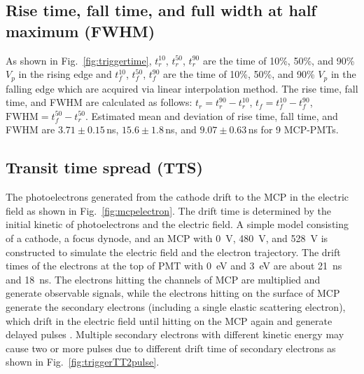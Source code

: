 \subsection{Rise time, fall time, and full width at half maximum (FWHM)}
As shown in Fig.~\ref{fig:triggertime}, $t^{10}_r$, $t^{50}_r$, $t^{90}_r$ are the time of 10\%, 50\%, and 90\% $V_p$ in the rising edge and $t^{10}_f$, $t^{50}_f$, $t^{90}_f$ are the time of 10\%, 50\%, and 90\% $V_p$ in the falling edge which are acquired via linear interpolation method. The rise time, fall time, and FWHM are calculated as follows: $t_r = t^{90}_r - t^{10}_r$, $t_f = t^{10}_f - t^{90}_f$, $\mathrm{FWHM} = t^{50}_f - t^{50}_r$. Estimated mean and deviation of rise time, fall time, and FWHM are $3.71\pm0.15$\,ns, $15.6\pm1.8$\,ns, and $9.07\pm0.63$\,ns for 9 MCP-PMTs.

\subsection{Transit time spread (TTS)}
The photoelectrons generated from the cathode drift to the MCP in the electric field as shown in Fig.~\ref{fig:mcpelectron}. The drift time is determined by the initial kinetic of photoelectrons and the electric field. A simple model consisting of a cathode, a focus dynode, and an MCP with \SI{0}{V}, \SI{480}{V}, and \SI{528}{V} is constructed to simulate the electric field and the electron trajectory. The drift times of the electrons at the top of PMT with \SI{0}{eV} and \SI{3}{eV} are about \SI{21}{ns} and \SI{18}{ns}. The electrons hitting the channels of MCP are multiplied and generate observable signals, while the electrons hitting on the surface of MCP generate the secondary electrons (including a single elastic scattering electron), which drift in the electric field until hitting on the MCP again and generate delayed pulses \cite{KM3NetTesting}. Multiple secondary electrons with different kinetic energy  may cause two or more pulses due to different drift time of secondary electrons as shown in Fig.~\ref{fig:triggerTT2pulse}.

